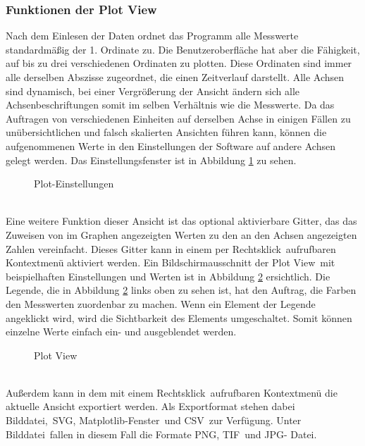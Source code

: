 \subsubsection{Funktionen der Plot View}
\label{subsubsec:PlotViewFunktion}
Nach dem Einlesen der Daten ordnet das Programm alle Messwerte standardmäßig der 1. Ordinate zu. Die Benutzeroberfläche hat aber die Fähigkeit, auf bis zu drei verschiedenen Ordinaten zu plotten. Diese Ordinaten sind immer alle derselben Abszisse zugeordnet, die einen Zeitverlauf darstellt. Alle Achsen sind dynamisch, bei einer Vergrößerung der Ansicht ändern sich alle Achsenbeschriftungen somit im selben Verhältnis wie die Messwerte. Da das Auftragen von verschiedenen Einheiten auf derselben Achse in einigen Fällen zu unübersichtlichen und falsch skalierten Ansichten führen kann, können die aufgenommenen Werte in den Einstellungen der Software auf andere Achsen gelegt werden. Das Einstellungsfenster ist in Abbildung \ref{fig:plotsettings} zu sehen.
\begin{figure}[h]
\centering
\missingfigure{}
\caption{Plot-Einstellungen}
\label{fig:plotsettings}
\end{figure}
\\
Eine weitere Funktion dieser Ansicht ist das optional aktivierbare Gitter, das das Zuweisen von im Graphen angezeigten Werten zu den an den Achsen angezeigten Zahlen vereinfacht. Dieses Gitter kann in einem per \glqq Rechtsklick\grqq \ aufrufbaren Kontextmenü aktiviert werden. Ein Bildschirmausschnitt der \glqq Plot View\grqq \ mit beispielhaften Einstellungen und Werten ist in Abbildung \ref{fig:PlotView} ersichtlich. Die Legende, die in Abbildung \ref{fig:PlotView} links oben zu sehen ist, hat den Auftrag, die Farben den Messwerten zuordenbar zu machen. Wenn ein Element der Legende angeklickt wird, wird die Sichtbarkeit des Elements umgeschaltet. Somit können einzelne Werte einfach ein- und ausgeblendet werden.
\begin{figure}[h]
\centering
\missingfigure{}
\caption{Plot View}
\label{fig:PlotView}
\end{figure}
\\
Außerdem kann in dem mit einem \glqq Rechtsklick\grqq \ aufrufbaren Kontextmenü die aktuelle Ansicht exportiert werden. Als Exportformat stehen dabei \glqq Bilddatei\grqq ,\ \glqq \ac{SVG}\grqq , \glqq Matplotlib-Fenster\grqq\ und \glqq \ac{CSV}\grqq\ zur Verfügung. Unter \glqq Bilddatei\grqq\ fallen in diesem Fall die Formate \glqq\ac{PNG}\grqq , \glqq\ac{TIF}\grqq\ und \glqq\ac{JPG}- Datei\grqq .
